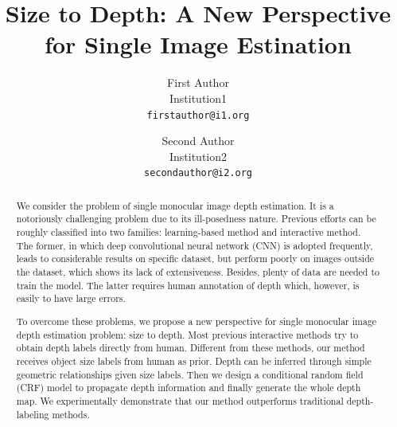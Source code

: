 \documentclass[10pt,twocolumn,letterpaper]{article}
\begin{document}
\title{Size to Depth: A New Perspective for Single Image Estination}

\author{First Author \\
Institution1\\
{\tt\small firstauthor@i1.org}
\and
Second Author \\
Institution2\\
{\tt\small secondauthor@i2.org}
}

\maketitle
\ifwacvfinal\thispagestyle{empty}\fi

\begin{abstract}
We consider the problem of single monocular image depth estimation. It is a notoriously challenging problem due to its ill-posedness nature. Previous efforts can be roughly classified into two families: learning-based method and interactive method. The former, in which deep convolutional neural network (CNN) is adopted frequently, leads to considerable results on specific dataset, but perform poorly on images outside the dataset, which shows its lack of extensiveness. Besides, plenty of data are needed to train the model. The latter requires human annotation of depth which, however, is easily to have large errors.

To overcome these problems, we propose a new perspective for single monocular image depth estimation problem: size to depth. Most previous interactive methods try to obtain depth labels directly from human. Different from these methods, our method receives object size labels from human as prior. Depth can be inferred through simple geometric relationships given size labels. Then we design a conditional random field (CRF) model to propagate depth information and finally generate the whole depth map. We experimentally demonstrate that our method outperforms traditional depth-labeling methods.
\end{abstract}
\end{document}
